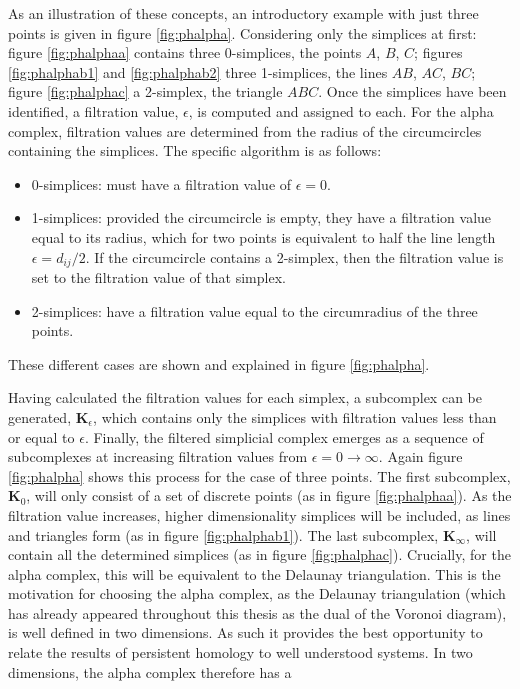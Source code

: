 As an illustration of these concepts, an introductory example with just three points is given in figure \ref{fig:phalpha}.
Considering only the simplices at first: figure \ref{fig:phalphaa} contains three 0\--simplices, the points $A$, $B$, $C$; figures \ref{fig:phalphab1} and \ref{fig:phalphab2} three 1\--simplices, the lines $AB$, $AC$, $BC$; figure \ref{fig:phalphac} a 2\--simplex, the triangle $ABC$.
Once the simplices have been identified, a filtration value, $\epsilon$, is computed and assigned to each.
For the alpha complex, filtration values are determined from the radius of the circumcircles containing the simplices.
The specific algorithm is as follows:
\begin{itemize}
	\item 0\--simplices: must have a filtration value of $\epsilon=0$.
	\item 1\--simplices: provided the circumcircle is empty, they have a filtration value equal to its radius, which for two points is equivalent to half the line length $\epsilon=d_{ij}/2$.
	If the circumcircle contains a 2\--simplex, then the filtration value is set to the filtration value of that simplex.
	\item 2\--simplices: have a filtration value equal to the circumradius of the three points.
\end{itemize}
These different cases are shown and explained in figure \ref{fig:phalpha}.

Having calculated the filtration values for each simplex, a subcomplex can be generated, $\mathbf{K}_\epsilon$, which contains only the simplices with filtration values less than or equal to $\epsilon$.
Finally, the filtered simplicial complex emerges as a sequence of subcomplexes at increasing filtration values from $\epsilon=0\rightarrow \infty$.
Again figure \ref{fig:phalpha} shows this process for the case of three points.
The first subcomplex, $\mathbf{K}_0$, will only consist of a set of discrete points (as in figure \ref{fig:phalphaa}).
As the filtration value increases, higher dimensionality simplices will be included, as lines and triangles form (as in figure \ref{fig:phalphab1}).
The last subcomplex, $\mathbf{K}_\infty$, will contain all the determined simplices (as in figure \ref{fig:phalphac}).
Crucially, for the alpha complex, this will be equivalent to the Delaunay triangulation.
This is the motivation for choosing the alpha complex, as the Delaunay triangulation (which has already appeared throughout this thesis as the dual of the Voronoi diagram), is well defined in two dimensions. 
As such it provides the best opportunity to relate the results of persistent homology to well understood systems.
In two dimensions, the alpha complex therefore has a 

